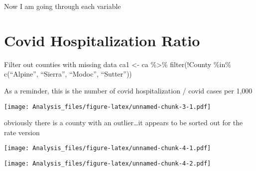 \documentclass[
]{article}
\newenvironment{Shaded}{\begin{snugshade}}{\end{snugshade}}
\newcommand{\CommentTok}[1]{\textcolor[rgb]{0.56,0.35,0.01}{\textit{#1}}}
\newcommand{\FunctionTok}[1]{\textcolor[rgb]{0.00,0.00,0.00}{#1}}
\newcommand{\NormalTok}[1]{#1}
\newcommand{\OtherTok}[1]{\textcolor[rgb]{0.56,0.35,0.01}{#1}}
\newcommand{\SpecialCharTok}[1]{\textcolor[rgb]{0.00,0.00,0.00}{#1}}
\begin{document}
Now I am going through each variable

\hypertarget{covid-hospitalization-ratio}{%
\section{Covid Hospitalization
Ratio}\label{covid-hospitalization-ratio}}

Filter out counties with missing data ca1 \textless- ca \%\textgreater\%
filter(!County \%in\% c(``Alpine'', ``Sierra'', ``Modoc'', ``Sutter''))

As a reminder, this is the number of covid hospitalization / covid cases
per 1,000

\begin{Shaded}
\end{Shaded}

\texttt{[image: Analysis\_files/figure-latex/unnamed-chunk-3-1.pdf]}

obviously there is a county with an outlier\ldots it appears to be
sorted out for the rate version

\begin{Shaded}
\end{Shaded}

\texttt{[image: Analysis\_files/figure-latex/unnamed-chunk-4-1.pdf]}

\begin{Shaded}
\end{Shaded}

\texttt{[image: Analysis\_files/figure-latex/unnamed-chunk-4-2.pdf]}

\begin{Shaded}
\end{Shaded}
\end{document}
